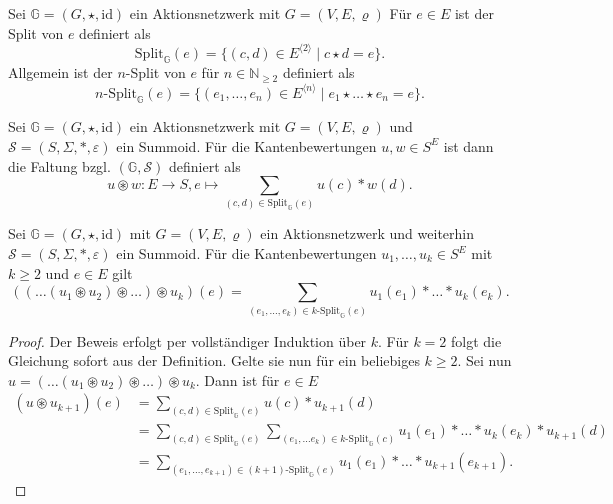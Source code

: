 \documentclass{article}
\begin{document}
\begin{definition}
  Sei $\mathbb{G} = (G, \star, \text{id})$ ein Aktionsnetzwerk mit $G = (V, E, \varrho)$
  Für $e \in E$ ist der Split von $e$ definiert als
  \begin{equation*}
    \text{Split}_\mathbb{G}(e) = \{(c, d) \in E^{\langle 2 \rangle} \mid c \star d = e\}.
  \end{equation*}
  Allgemein ist der $n$-Split von $e$ für $n \in \mathbb{N}_{\geq 2}$ definiert als
  \begin{equation*}
    n\text{-Split}_\mathbb{G}(e) = \{(e_1, \dots, e_n) \in E^{\langle n \rangle} \mid e_1 \star \dots \star e_n = e\}.
  \end{equation*}
\end{definition}

\begin{definition}
  Sei $\mathbb{G} = (G, \star, \text{id})$ ein Aktionsnetzwerk mit $G = (V, E, \varrho)$
  und $\mathcal{S} = (S, \Sigma, \ast, \varepsilon)$ ein Summoid.
  Für die Kantenbewertungen $u, w \in S^E$ ist dann die Faltung bzgl. $(\mathbb{G}, \mathcal{S})$
  definiert als
  \begin{equation*}
    u \circledast w \colon E \to S, e \mapsto \sum_{(c, d) \in \text{Split}_\mathbb{G}(e)}u(c) \ast w(d).
  \end{equation*}
\end{definition}

\begin{theorem}
  Sei $\mathbb{G} = (G, \star, \text{id})$ mit $G = (V, E, \varrho)$ ein Aktionsnetzwerk
  und weiterhin $\mathcal{S} = (S, \Sigma, \ast, \varepsilon)$ ein Summoid.
  Für die Kantenbewertungen $u_1, \dots, u_k \in S^E$ mit $k \geq 2$ 
  und $e \in E$ gilt
  \begin{equation*}
    ((\dots (u_1 \circledast u_2) \circledast \dots ) \circledast u_k)(e) = \sum_{(e_1, \dots, e_k) \in k\text{-Split}_\mathbb{G}(e)}u_1(e_1) \ast \dots \ast u_k(e_k).
  \end{equation*}
\end{theorem}
\begin{proof}
  Der Beweis erfolgt per vollständiger Induktion über $k$.
  Für $k = 2$ folgt die Gleichung sofort aus der Definition.
  Gelte sie nun für ein beliebiges $k \geq 2$.
  Sei nun $u = (\dots(u_1 \circledast u_2) \circledast \dots) \circledast u_k$.
  Dann ist für $e \in E$
  \begin{align*}
    (u \circledast u_{k + 1})(e)
    &= \sum_{(c, d) \in \text{Split}_\mathbb{G}(e)} u(c) \ast u_{k + 1}(d) \\
    &= \sum_{(c, d) \in \text{Split}_\mathbb{G}(e)} \sum_{(e_1, \dots e_k) \in k\text{-Split}_\mathbb{G}(c)} u_1(e_1) \ast \dots \ast u_k(e_k) \ast u_{k + 1}(d) \\
    &= \sum_{(e_1, \dots, e_{k + 1}) \in (k + 1)\text{-Split}_\mathbb{G}(e)} u_1(e_1) \ast \dots \ast u_{k + 1}(e_{k + 1}).
   \end{align*}
\end{proof}
\end{document}

